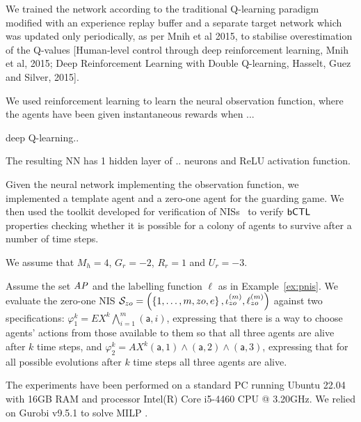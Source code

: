 We trained the network according to the traditional Q-learning paradigm modified with an experience replay buffer and a separate target network which was updated only periodically, as per Mnih et al 2015, to stabilise overestimation of the Q-values [Human-level control through deep reinforcement learning, Mnih et al, 2015; Deep Reinforcement Learning with Double Q-learning, Hasselt, Guez and Silver, 2015]. 



We used reinforcement learning to learn the neural observation function, where
the agents have been given instantaneous rewards when ...

deep Q-learning..

The resulting NN has 1 hidden layer of .. neurons and ReLU activation function.



Given the neural network implementing the observation function, we 
implemented a template agent and a zero-one agent for the guarding game. We
then used the \venmas toolkit developed for verification of
NISs~\cite{Akintunde+20b} to verify $\sf{bCTL}$ properties checking whether it is
possible for a colony of agents to survive after a number of time steps.

We assume that $M_h = 4$, $G_r = -2$, $R_r = 1$ and $U_r = -3$. 

Assume the set $\it{AP}$ and the labelling function $\ell$ as in
Example~\ref{ex:pnis}. We evaluate the zero-one NIS
$\mathcal S_{zo} = \left ( \left \{ 1,\ldots,m,zo,e \right \}, \iota^{({m})}_{zo}, \ell^{(m)}_{zo} \right )$
against two specifications:
$\varphi^k_1 = EX^k \bigwedge_{i=1}^m(\mathsf{a},i)$,
expressing that there is a way to choose agents' actions from those available
to them so that all three agents are alive after $k$ time steps, and
$\varphi^k_2 = AX^k (\mathsf{a},1) \land (\mathsf{a},2) \land (\mathsf{a},3)$,
expressing that for all possible evolutions after $k$ time steps all three
agents are alive.

The experiments have been performed on a standard PC running Ubuntu 22.04 with
16GB RAM and processor Intel(R) Core i5-4460 CPU @ 3.20GHz. We relied on Gurobi
v9.5.1 to solve MILP \cite{Gurobi+16a}.



